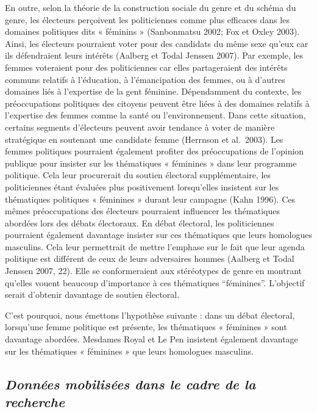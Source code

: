 \documentclass[
  letterpaper,
  DIV=11,
  numbers=noendperiod]{scrartcl}
\begin{document}
En outre, selon la théorie de la construction sociale du genre et du
schéma du genre, les électeurs perçoivent les politiciennes comme plus
efficaces dans les domaines politiques dits « féminins » (Sanbonmatsu
2002; Fox et Oxley 2003). Ainsi, les électeurs pourraient voter pour des
candidats du même sexe qu'eux car ils défendraient leurs intérêts
(Aalberg et Todal Jenssen 2007). Par exemple, les femmes voteraient pour
des politiciennes car elles partageraient des intérêts communs relatifs
à l'éducation, à l'émancipation des femmes, ou à d'autres domaines liés
à l'expertise de la gent féminine. Dépendamment du contexte, les
préoccupations politiques des citoyens peuvent être liées à des domaines
relatifs à l'expertise des femmes comme la santé ou l'environnement.
Dans cette situation, certains segments d'électeurs peuvent avoir
tendance à voter de manière stratégique en soutenant une candidate femme
(Herrnson et al.~2003). Les femmes politiques pourraient également
profiter des préoccupations de l'opinion publique pour insister sur les
thématiques « féminines » dans leur programme politique. Cela leur
procurerait du soutien électoral supplémentaire, les politiciennes étant
évaluées plus positivement lorsqu'elles insistent sur les thématiques
politiques « féminines » durant leur campagne (Kahn 1996). Ces mêmes
préoccupations des électeurs pourraient influencer les thématiques
abordées lors des débats électoraux. En débat électoral, les
politiciennes pourraient également davantage insister sur ces
thématiques que leurs homologues masculins. Cela leur permettrait de
mettre l'emphase sur le fait que leur agenda politique est différent de
ceux de leurs adversaires hommes (Aalberg et Todal Jenssen 2007, 22).
Elle se conformeraient aux stéréotypes de genre en montrant qu'elles
vouent beaucoup d'importance à ces thématiques ``féminines''. L'objectif
serait d'obtenir davantage de soutien électoral.

C'est pourquoi, nous émettons l'hypothèse suivante : dans un débat
électoral, lorsqu'une femme politique est présente, les thématiques «
féminines » sont davantage abordées. Mesdames Royal et Le Pen insistent
également davantage sur les thématiques « féminines » que leurs
homologues masculins.

\hypertarget{donnuxe9es-mobilisuxe9es-dans-le-cadre-de-la-recherche}{%
\subsection{\texorpdfstring{\emph{Données mobilisées dans le cadre de la
recherche}}{Données mobilisées dans le cadre de la recherche}}\label{donnuxe9es-mobilisuxe9es-dans-le-cadre-de-la-recherche}}
\end{document}
